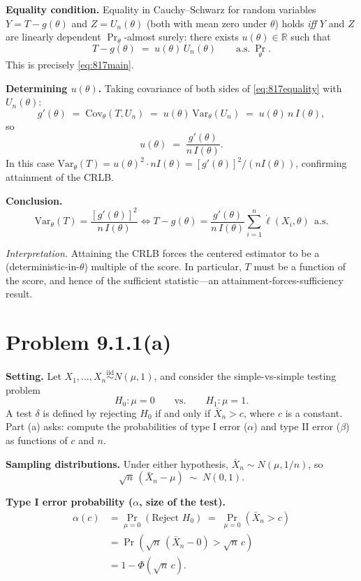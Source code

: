 \documentclass[11pt]{article}
\newcommand{\R}{\mathbb{R}}
\newcommand{\Var}{\mathrm{Var}}
\newcommand{\Cov}{\mathrm{Cov}}
\newcommand{\iid}{\stackrel{\text{iid}}{\sim}}
\begin{document}
\textbf{Equality condition.} Equality in Cauchy--Schwarz for random variables $Y=T-g(\theta)$ and $Z=U_n(\theta)$ (both with mean zero under $\theta$) holds \emph{iff} $Y$ and $Z$ are linearly dependent $\Pr_\theta$-almost surely: there exists $u(\theta)\in\R$ such that
\begin{equation}\label{eq:817equality}
T - g(\theta) \;=\; u(\theta)\,U_n(\theta) \qquad \text{a.s.}\ \Pr_\theta.
\end{equation}
This is precisely \eqref{eq:817main}.

\textbf{Determining $u(\theta)$.} Taking covariance of both sides of \eqref{eq:817equality} with $U_n(\theta)$:
\[
g'(\theta) \;=\; \Cov_\theta(T,U_n) \;=\; u(\theta)\,\Var_\theta(U_n) \;=\; u(\theta)\,n\,I(\theta),
\]
so
\[
u(\theta) \;=\; \frac{g'(\theta)}{n\,I(\theta)}.
\]
In this case $\Var_\theta(T) = u(\theta)^2\cdot n I(\theta) = [g'(\theta)]^2/(n I(\theta))$, confirming attainment of the CRLB.

\textbf{Conclusion.}
\[
\boxed{\; \Var_\theta(T) = \frac{[g'(\theta)]^2}{n\,I(\theta)} \iff T - g(\theta) = \frac{g'(\theta)}{n\,I(\theta)}\sum_{i=1}^n \dot\ell(X_i,\theta)\ \ \text{a.s.}\;}
\]

\textit{Interpretation.} Attaining the CRLB forces the centered estimator to be a (deterministic-in-$\theta$) multiple of the score. In particular, $T$ must be a function of the score, and hence of the sufficient statistic---an attainment-forces-sufficiency result.

\bigskip
\section*{Problem 9.1.1(a)}
\textbf{Setting.} Let $X_1,\dots,X_n \iid N(\mu,1)$, and consider the simple-vs-simple testing problem
\[
H_0: \mu = 0 \qquad \text{vs.} \qquad H_1: \mu = 1.
\]
A test $\delta$ is defined by rejecting $H_0$ if and only if $\bar X_n > c$, where $c$ is a constant. Part (a) asks: compute the probabilities of type I error ($\alpha$) and type II error ($\beta$) as functions of $c$ and $n$.

\textbf{Sampling distributions.} Under either hypothesis, $\bar X_n\sim N(\mu, 1/n)$, so
\[
\sqrt{n}\,(\bar X_n - \mu) \;\sim\; N(0,1).
\]

\textbf{Type I error probability ($\alpha$, size of the test).}
\begin{align*}
\alpha(c) &= \Pr_{\mu=0}(\text{Reject } H_0) \;=\; \Pr_{\mu=0}(\bar X_n > c) \\
&= \Pr\!\left(\sqrt{n}\,(\bar X_n - 0) > \sqrt{n}\, c\right) \\
&= 1 - \Phi(\sqrt{n}\,c).
\end{align*}
\end{document}
